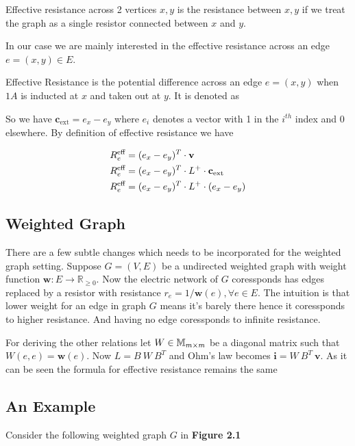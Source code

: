 Effective resistance across 2 vertices $x,y$ is the resistance between $x,y$ if we treat the graph as a single resistor connected between $x$ and $y$. 

In our case we are mainly interested in the effective resistance across an edge $e = (x,y) \in E$.

\begin{Bd}
 Effective Resistance is the potential difference across an edge $e = (x,y)$ when $1A$ is inducted at $x$ and taken out at $y$. It is denoted as 
\end{Bd}

So we have $\textbf{c}_{\text{ext}} = e_x - e_y$ where $e_i$ denotes a vector with 1 in the $i^{th}$ index and 0 elsewhere. By definition of effective resistance we have 

\begin{align*}
 R_e^{\text{eff}} &= (e_x - e_y)^T \cdot \textbf{v} \\
 R_e^{\text{eff}} &= (e_x - e_y)^T \cdot L^+  \cdot \textbf{c}_{\text{ext}} \\
 R_e^{\text{eff}} &= (e_x - e_y)^T \cdot L^+  \cdot (e_x - e_y) 
\end{align*}


\subsection{Weighted Graph}

There are a few subtle changes which needs to be incorporated for the weighted graph setting. Suppose $G=(V,E)$ be a undirected weighted graph with weight function $\textbf{w}: E \rightarrow \mathbb{R}_{\geq 0}$. Now the electric network of $G$ coressponds has edges replaced by a resistor with resistance $r_e = 1 / \textbf{w}(e) , \forall e \in E$. The intuition is that lower weight for an edge in graph $G$ means it's barely there hence it coressponds to higher resistance. And having no edge coressponds to infinite resistance. 

For deriving the other relations let $W \in \mathbb{M}_{m \times m}$ be a diagonal matrix such that $W(e,e) = \textbf{w}(e)$. Now $L = B \ W \ B^T$ and Ohm's law becomes $\textbf{i} = W \ B^T \ \textbf{v} $. As it can be seen the formula for effective resistance remains the same

\pagebreak


\subsection{An Example}
Consider the following weighted graph $G$ in \textbf{Figure 2.1}


